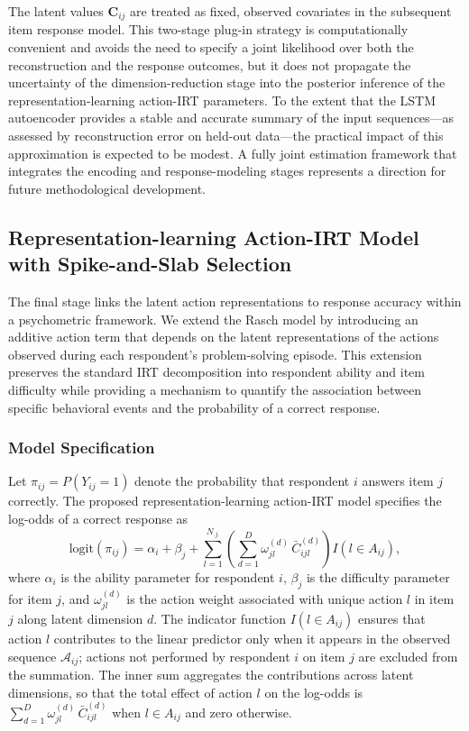 \documentclass[A4paper,11pt]{article}
\begin{document}
The latent values $\mathbf{C}_{ij}$ are treated as fixed, observed covariates in the subsequent item response model. This two-stage plug-in strategy is computationally convenient and avoids the need to specify a joint likelihood over both the reconstruction and the response outcomes, but it does not propagate the uncertainty of the dimension-reduction stage into the posterior inference of the representation-learning action-IRT parameters. To the extent that the LSTM autoencoder provides a stable and accurate summary of the input sequences---as assessed by reconstruction error on held-out data---the practical impact of this approximation is expected to be modest. A fully joint estimation framework that integrates the encoding and response-modeling stages represents a direction for future methodological development.

\subsection{Representation-learning Action-IRT Model with Spike-and-Slab Selection}

The final stage links the latent action representations to response accuracy within a psychometric framework. We extend the Rasch model by introducing an additive action term that depends on the latent representations of the actions observed during each respondent's problem-solving episode. This extension preserves the standard IRT decomposition into respondent ability and item difficulty while providing a mechanism to quantify the association between specific behavioral events and the probability of a correct response.

\subsubsection{Model Specification}

Let $\pi_{ij}=P(Y_{ij}=1)$ denote the probability that respondent $i$ answers item $j$ correctly. The proposed representation-learning action-IRT model specifies the log-odds of a correct response as
\begin{equation}\label{eq:action_irt}
\mathrm{logit}(\pi_{ij})
=
\alpha_i+\beta_j
+
\sum_{l=1}^{N_{.j.}}
\left(
\sum_{d=1}^{D}
\omega_{jl}^{(d)}\,\bar{C}_{ijl}^{(d)}
\right)
I(l\in A_{ij}),
\end{equation}
where $\alpha_i$ is the ability parameter for respondent $i$, $\beta_j$ is the difficulty parameter for item $j$, and $\omega_{jl}^{(d)}$ is the action weight associated with unique action $l$ in item $j$ along latent dimension $d$. The indicator function $I(l\in A_{ij})$ ensures that action $l$ contributes to the linear predictor only when it appears in the observed sequence $\mathcal{A}_{ij}$; actions not performed by respondent $i$ on item $j$ are excluded from the summation. The inner sum aggregates the contributions across latent dimensions, so that the total effect of action $l$ on the log-odds is $\sum_{d=1}^{D}\omega_{jl}^{(d)}\,\bar{C}_{ijl}^{(d)}$ when $l\in A_{ij}$ and zero otherwise.
\end{document}
